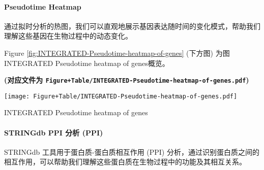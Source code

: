 \documentclass[
]{article}
\begin{document}
\begin{center}\vspace{1.5cm}\end{center}

\hypertarget{pseudotime-heatmap}{%
\paragraph{Pseudotime Heatmap}\label{pseudotime-heatmap}}

通过拟时分析的热图，我们可以直观地展示基因表达随时间的变化模式，帮助我们理解这些基因在生物过程中的动态变化。

\begin{center}\vspace{1.5cm}\end{center}

Figure \ref{fig:INTEGRATED-Pseudotime-heatmap-of-genes} (下方图) 为图INTEGRATED Pseudotime heatmap of genes概览。

\textbf{(对应文件为 \texttt{Figure+Table/INTEGRATED-Pseudotime-heatmap-of-genes.pdf})}

\def\@captype{figure}
\begin{center}
\texttt{[image: Figure+Table/INTEGRATED-Pseudotime-heatmap-of-genes.pdf]}
\caption{INTEGRATED Pseudotime heatmap of genes}\label{fig:INTEGRATED-Pseudotime-heatmap-of-genes}
\end{center}

\begin{center}\vspace{1.5cm}\end{center}

\hypertarget{stringdb-ppi-ux5206ux6790-ppi}{%
\paragraph{STRINGdb PPI 分析 (PPI)}\label{stringdb-ppi-ux5206ux6790-ppi}}

STRINGdb 工具用于蛋白质-蛋白质相互作用 (PPI) 分析，通过识别蛋白质之间的相互作用，可以帮助我们理解这些蛋白质在生物过程中的功能及其相互关系。

\begin{center}\vspace{1.5cm}\end{center}
\end{document}
